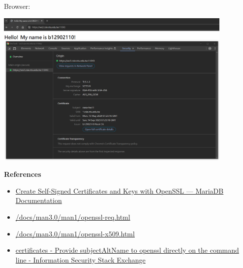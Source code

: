 \documentclass[12pt, a4paper]{article}
\begin{document}
\begin{enumerate}[resume]
\begin{enumerate}[resume]
      \pagebreak
      Browser:

      \includegraphics[width=0.87\textwidth]{12-c_browser.png}

      \vspace{\baselineskip}
      \textbf{References}
      \begin{itemize}
        \item \href{https://mariadb.com/docs/server/security/data-in-transit-encryption/create-self-signed-certificates-keys-openssl/}{Create Self-Signed Certificates and Keys with OpenSSL — MariaDB Documentation}
        \item \href{https://www.openssl.org/docs/man3.0/man1/openssl-req.html}{/docs/man3.0/man1/openssl-req.html}
        \item \href{https://www.openssl.org/docs/man3.0/man1/openssl-x509.html}{/docs/man3.0/man1/openssl-x509.html}
        \item \href{https://security.stackexchange.com/questions/74345/provide-subjectaltname-to-openssl-directly-on-the-command-line}{certificates - Provide subjectAltName to openssl directly on the command line - Information Security Stack Exchange}
      \end{itemize}
    \end{enumerate}
  \end{enumerate}

  \pagebreak
\end{document}
